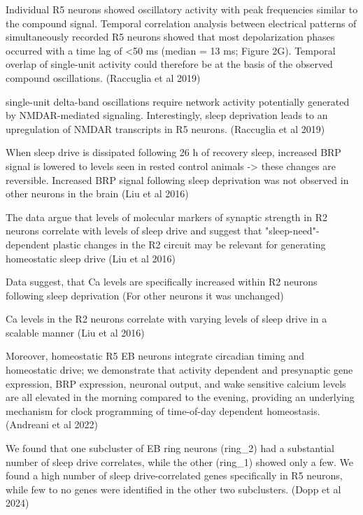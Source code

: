 Individual R5 neurons showed oscillatory activity with peak frequencies similar to the compound signal.
Temporal correlation analysis between electrical patterns of simultaneously recorded R5 neurons showed that most depolarization phases occurred with a time lag of <50 ms (median = 13 ms; Figure 2G). Temporal overlap of single-unit activity could therefore be at the basis of the observed compound oscillations.
\parencite{raccugliaNetworkSpecificSynchronizationElectrical2019} (Raccuglia et al 2019)

single-unit delta-band oscillations require network activity potentially generated by NMDAR-mediated signaling. Interestingly, sleep deprivation leads to an upregulation of NMDAR transcripts in R5 neurons.
\parencite{raccugliaNetworkSpecificSynchronizationElectrical2019} (Raccuglia et al 2019)



When sleep drive is dissipated following 26 h of recovery sleep, increased BRP signal is lowered to levels seen in rested
    control animals -> these changes are reversible. Increased BRP signal following sleep
    deprivation was not observed in other neurons in the brain \parencite{liuSleepDriveEncoded2016}
    (Liu et al 2016)
    
    The data argue that levels of molecular markers of synaptic strength in R2 neurons correlate with levels of sleep
    drive and suggest that "sleep-need"-dependent plastic changes in the R2 circuit may be relevant for generating
    homeostatic sleep drive \parencite{liuSleepDriveEncoded2016}
    (Liu et al 2016)

    Data suggest, that Ca levels are specifically increased within R2 neurons following sleep deprivation (For other neurons
    it was unchanged) \parencite{liuSleepDriveEncoded2016}

    Ca levels in the R2 neurons correlate with varying levels of sleep drive in a scalable manner \parencite{liuSleepDriveEncoded2016}
    (Liu et al 2016)

Moreover, homeostatic R5 EB neurons integrate circadian timing and homeostatic drive;
we demonstrate that activity dependent and presynaptic gene expression, BRP expression,
neuronal output, and wake sensitive calcium levels are all elevated in the morning
compared to the evening, providing an underlying mechanism for clock programming of
time-of-day dependent homeostasis.
\parencite{andreaniCircadianProgrammingEllipsoid2022} (Andreani et al 2022)

We found that one subcluster of EB ring neurons (ring\_2) had a 
substantial number of sleep drive correlates, while the
other (ring\_1) showed only a few. We found a high number of sleep
drive-correlated genes specifically in R5 neurons,
while few to no genes were identified in the other two subclusters.
(Dopp et al 2024)


